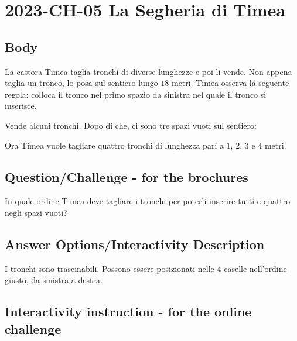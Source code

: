 \documentclass[a4paper,11pt]{report}
\newcommand{\taskGraphicsFolder}{..}
\begin{document}
\section*{\centering{} 2023-CH-05 La Segheria di Timea}


\subsection*{Body}

La castora Timea taglia tronchi di diverse lunghezze e poi li vende.
Non appena taglia un tronco, lo posa sul sentiero lungo $18$ metri.
Timea osserva la seguente regola: colloca il tronco nel primo spazio da sinistra nel quale il tronco si inserisce.

Vende alcuni tronchi. Dopo di che, ci sono tre spazi vuoti sul sentiero:

{\centering%
\par}

Ora Timea vuole tagliare quattro tronchi di lunghezza pari a $1$, $2$, $3$ e $4$ metri.

{\em


\subsection*{Question/Challenge - for the brochures}

In quale ordine Timea deve tagliare i tronchi per poterli inserire tutti e quattro negli spazi vuoti?

{\centering%
\par}

}

\begingroup
\renewcommand{\arraystretch}{1.5}
\subsection*{Answer Options/Interactivity Description}

I tronchi sono trascinabili. Possono essere posizionati nelle $4$ caselle nell’ordine giusto, da sinistra a destra.

\endgroup

\subsection*{Interactivity instruction - for the online challenge}
\end{document}
